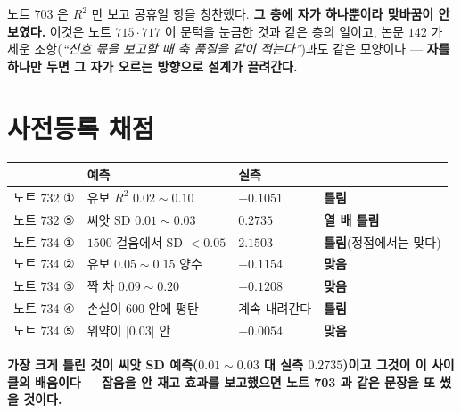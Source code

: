 \documentclass[10pt,a4paper]{article}
\begin{document}
노트 $703$ 은 $R^2$ 만 보고 공휴일 항을 칭찬했다. \textbf{그 층에 자가 하나뿐이라
맞바꿈이 안 보였다.} 이것은 노트 $715 \cdot 717$ 이 문턱을 눈금한 것과 같은 층의
일이고, 논문 $142$ 가 세운 조항(\emph{``신호 몫을 보고할 때 축 품질을 같이
적는다''})과도 같은 모양이다 --- \textbf{자를 하나만 두면 그 자가 오르는 방향으로
설계가 끌려간다.}

\section{사전등록 채점}

\begin{center}
\begin{tabular}{llll}
\toprule
& 예측 & 실측 & \\
\midrule
노트 $732$ ① & 유보 $R^2$ $0.02 \sim 0.10$ & $-0.1051$ & \textbf{틀림} \\
노트 $732$ ⑤ & 씨앗 SD $0.01 \sim 0.03$ & $\mathbf{0.2735}$ & \textbf{열 배 틀림} \\
노트 $734$ ① & $1500$ 걸음에서 SD $<0.05$ & $2.1503$ & \textbf{틀림}(정점에서는 맞다) \\
노트 $734$ ② & 유보 $0.05 \sim 0.15$ 양수 & $+0.1154$ & \textbf{맞음} \\
노트 $734$ ③ & 짝 차 $0.09 \sim 0.20$ & $+0.1208$ & \textbf{맞음} \\
노트 $734$ ④ & 손실이 $600$ 안에 평탄 & 계속 내려간다 & \textbf{틀림} \\
노트 $734$ ⑤ & 위약이 $|0.03|$ 안 & $-0.0054$ & \textbf{맞음} \\
\bottomrule
\end{tabular}
\end{center}

\textbf{가장 크게 틀린 것이 씨앗 SD 예측($0.01{\sim}0.03$ 대 실측 $0.2735$)이고
그것이 이 사이클의 배움이다} --- \textbf{잡음을 안 재고 효과를 보고했으면 노트 703
과 같은 문장을 또 썼을 것이다.}
\end{document}
